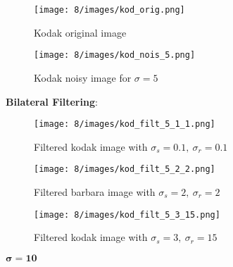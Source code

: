 \documentclass[12pt]{article}
\begin{document}
\begin{itemize}
    \begin{figure}[H]
        \centering
        \begin{minipage}{.45\textwidth}
          \centering
          \texttt{[image: 8/images/kod\_orig.png]}
          \caption*{Kodak original image}
          \label{fig:totalpowervst}
        \end{minipage}
        \begin{minipage}{.45\textwidth}
          \centering
          \texttt{[image: 8/images/kod\_nois\_5.png]}
          \caption*{Kodak noisy image for $\sigma = 5$}
          \label{fig:totalpower2}
        \end{minipage}
        \label{fig:totalPower}
    \end{figure}
    
    \textbf{Bilateral Filtering}:
    
    \begin{figure}[H]
        \centering
        \begin{minipage}{.45\textwidth}
          \centering
          \texttt{[image: 8/images/kod\_filt\_5\_1\_1.png]}
          \caption*{Filtered kodak image with $\sigma_s=0.1, \ \sigma_r=0.1$}
          \label{fig:totalpowervst}
        \end{minipage}
        \begin{minipage}{.45\textwidth}
          \centering
          \texttt{[image: 8/images/kod\_filt\_5\_2\_2.png]}
          \caption*{Filtered barbara image with $\sigma_s=2, \ \sigma_r=2$}
          \label{fig:totalpower2}
        \end{minipage}
        \label{fig:totalPower}
    \end{figure}
    
    \begin{figure}[H]
        \centering
        \begin{minipage}{.45\textwidth}
          \centering
          \texttt{[image: 8/images/kod\_filt\_5\_3\_15.png]}
          \caption*{Filtered kodak image with $\sigma_s=3, \ \sigma_r=15$}
          \label{fig:totalpowervst}
        \end{minipage}
    \end{figure}
    \newpage
    
    \begin{center}
        $\mathbf{\bm{\sigma} = 10}$
    \end{center}
    

\end{itemize}
\end{document}
